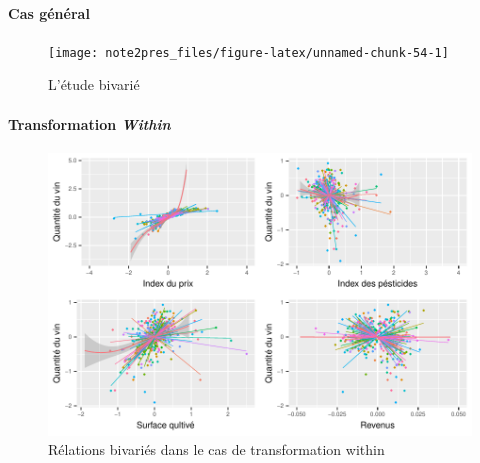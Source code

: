 \documentclass[11pt,]{article}
\let\oldparagraph\paragraph
\renewcommand{\paragraph}[1]{\oldparagraph{#1}\mbox{}}
\begin{document}
\hypertarget{cas-general}{%
\paragraph{Cas général}\label{cas-general}}

\FloatBarrier

\begin{figure}[!htbp]

{\centering \texttt{[image: note2pres\_files/figure-latex/unnamed-chunk-54-1]} 

}

\caption{L'étude bivarié}\label{fig:unnamed-chunk-54}
\end{figure}

\FloatBarrier

\hypertarget{transformation-within}{%
\paragraph{\texorpdfstring{Transformation
\emph{Within}}{Transformation Within}}\label{transformation-within}}

\FloatBarrier

\begin{figure}[!htbp]

{\centering \includegraphics{note2pres_files/figure-latex/unnamed-chunk-55-1} 

}

\caption{Rélations bivariés dans le cas de transformation within}\label{fig:unnamed-chunk-55}
\end{figure}

\FloatBarrier

\newpage
\end{document}
